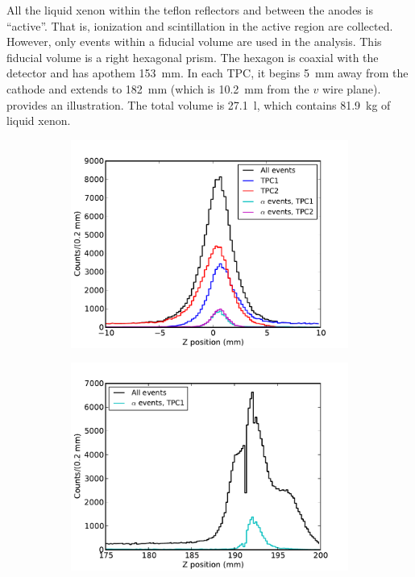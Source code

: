 \documentclass[herrin-thesis.tex]{subfiles}
\begin{document}
All the liquid xenon within the teflon reflectors and between the anodes is ``active''. That is, ionization and scintillation in the active region are collected. However, only events within a fiducial volume are used in the analysis. This fiducial volume is a right hexagonal prism. The hexagon is coaxial with the detector and has apothem \SI{153}{\mm}. In each TPC, it begins \SI{5}{\mm} away from the cathode and extends to \SI{182}{\mm} (which is \SI{10.2}{\mm} from the \(v\) wire plane).  provides an illustration. The total volume is \SI{27.1}{\litre}, which contains \SI{81.9}{\kg} of liquid xenon.

\begin{figure}[htb]
\centering
	\begin{subfigure}[b]{0.48\textwidth}
	\centering
	\includegraphics[width=\textwidth]{./plots/analysis_fiducial_vol_bg_cathode.pdf}
\end{subfigure}\hfill%
\begin{subfigure}[b]{0.48\textwidth}
	\centering
	\includegraphics[width=1\textwidth]{./plots/analysis_fiducial_vol_bg_anode.pdf}

\end{subfigure}
\end{figure}
\end{document}
